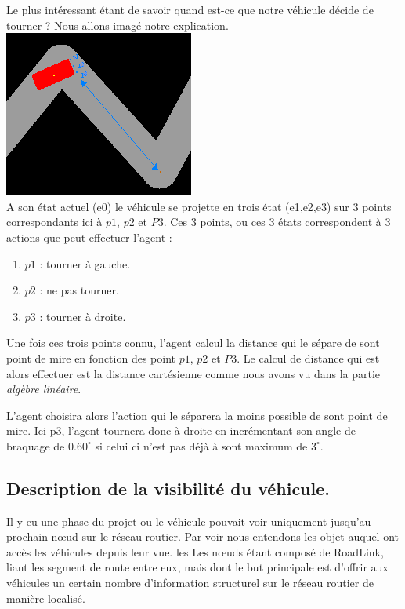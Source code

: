 \documentclass[a4paper,11pt]{article}
\newcommand{\orto}{^{\circ}}
\begin{document}
Le plus intéressant étant de savoir quand est-ce que notre véhicule décide de tourner ? Nous allons imagé notre explication.\\

\includegraphics[scale=0.7]{imgAlgo/turn3points.png}\\

A son état actuel (e0) le véhicule se projette en trois état (e1,e2,e3) sur 3 points correspondants ici à $p1$, $p2$ et $P3$. Ces 3 points, ou ces 3 états correspondent à 3 actions que peut effectuer l'agent : 
\begin{enumerate}
\item $p1$ : tourner à gauche.
\item $p2$ : ne pas tourner.
\item $p3$ : tourner à droite.
\end{enumerate}

Une fois ces trois points connu, l'agent calcul la distance qui le sépare de sont point de mire en fonction des point $p1$, $p2$ et $P3$. Le calcul de distance qui est alors effectuer est la distance cartésienne comme nous avons vu dans la partie \textit{algèbre linéaire}.

L'agent choisira alors l'action qui le séparera la moins possible de sont point de mire. Ici p3, l'agent tournera donc à droite en incrémentant son angle de braquage de $0.60\orto$ si celui ci n'est pas déjà à sont maximum de $3\orto$.

\subsection{Description de la visibilité du véhicule.}

Il y eu une phase du projet ou le véhicule pouvait voir uniquement jusqu'au prochain n\oe{}ud sur le réseau routier. Par voir nous entendons les objet auquel ont accès les véhicules depuis leur vue. les  Les nœuds étant composé de RoadLink, liant les segment de route entre eux, mais dont le but principale est d'offrir aux véhicules un certain nombre d'information structurel sur le réseau routier de manière localisé.
\end{document}
